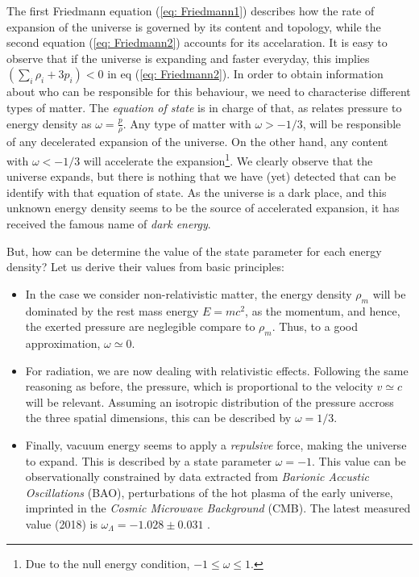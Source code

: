 \documentclass[11pt, a4paper]{article} %
\begin{document}
The first Friedmann equation (\ref{eq: Friedmann1}) describes how the rate of expansion of the universe is governed by its content and topology, while the second equation (\ref{eq: Friedmann2}) accounts for its accelaration. It is easy to observe that if the universe is expanding and faster everyday, this implies $\left(\sum_{i} \rho_{i} + 3 p_{i}\right) < 0$ in eq (\ref{eq: Friedmann2}). In order to obtain information about who can be responsible for this behaviour, we need to characterise different types of matter. The \textit{equation of state} is in charge of that, as relates pressure to energy density as $\omega = \tfrac{p}{\rho}$. Any type of matter with $\omega > - 1/3$, will be responsible of any decelerated expansion of the universe.  On the other hand, any content with $\omega < - 1/3$ will accelerate the expansion\footnote{Due to the null energy condition\cite{}, $-1\leq\omega\leq 1$. }. We clearly observe that the universe expands, but there is nothing that we have (yet) detected that can be identify with that equation of state. As the universe is a dark place, and this unknown energy density seems to be the source of accelerated expansion, it has received the famous name of \textit{dark energy}.

But, how can be determine the value of the state parameter for each energy density? Let us derive their values from basic principles:

\begin{itemize}
	\item In the case we consider non-relativistic matter, the energy density $\rho_{m}$ will be dominated by the rest mass energy $E = mc^{2}$, as the momentum, and hence, the exerted pressure are neglegible compare to $\rho_{m}$. Thus, to a good approximation, $\omega \simeq 0$.
	\item For radiation, we are now dealing with relativistic effects. Following the same reasoning as before, the pressure, which is proportional to the velocity $v \simeq c$ will be relevant. Assuming an isotropic distribution of the pressure accross the three spatial dimensions, this can be described by $\omega = 1/3$.
	\item Finally, vacuum energy seems to apply a \textit{repulsive} force, making the universe to expand. This is described by a state parameter $\omega = - 1$. This value can be observationally constrained by data extracted from \textit{Barionic Accustic Oscillations} (BAO), perturbations of the hot plasma of the early universe, imprinted in the \textit{Cosmic Microwave Background} (CMB). The latest measured value (2018) is $\omega_{\Lambda} = -1.028 \pm 0.031$ \cite{2020planck}.
\end{itemize}
\end{document}
